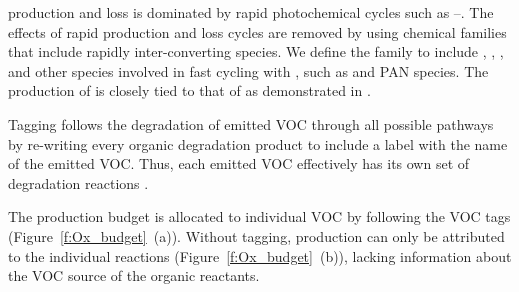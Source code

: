  production and loss is dominated by rapid photochemical cycles such as --.
The effects of rapid production and loss cycles are removed by using chemical families that include rapidly inter-converting species.
We define the  family to include , , ,  and other species involved in fast cycling with , such as  and PAN species.
The production of  is closely tied to that of  as demonstrated in \citet{Butler:2011}.

Tagging follows the degradation of emitted VOC through all possible pathways by re-writing every organic degradation product to include a label with the name of the emitted VOC.
Thus, each emitted VOC effectively has its own set of degradation reactions \citep{Butler:2011}.

%        
%        

The  production budget is allocated to individual VOC by following the VOC tags \mbox{(Figure \ref{f:Ox_budget} (a)).}
Without tagging,  production can only be attributed to the individual reactions \mbox{(Figure \ref{f:Ox_budget} (b))}, lacking information about the VOC source of the organic reactants.

